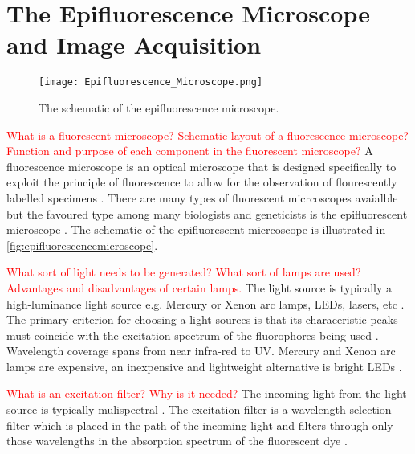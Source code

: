 
\section{The Epifluorescence Microscope and Image Acquisition}
\label{sec:TheEpifluorescenceMicroscope}

\begin{figure}[!t]
	\centering
	\texttt{[image: Epifluorescence\_Microscope.png]}
	\caption{The schematic of the epifluorescence microscope.}
	\label{fig:epifluorescencemicroscope}
\end{figure}

\textcolor{red}{What is a fluorescent microscope? Schematic layout of a fluorescence microscope? Function and purpose of each component in the fluorescent microscope?}
A fluorescence microscope is an optical microscope that is designed specifically to exploit the principle of fluorescence to allow for the observation of flourescently labelled specimens \citep{Hubeny2008,Sarder2006,Dobrucki2013,Andrews2002,Fatima2008}.
There are many types of fluorescent micrcoscopes avaialble but the favoured type among many biologists and geneticists is the epifluorescent microscope \citep{Rice2016,AbramowitzDavidson2016}.
The schematic of the epifluorescent micrcoscope is illustrated in \autoref{fig:epifluorescencemicroscope}.

\begin{definition}
	\textcolor{red}{What sort of light needs to be generated? What sort of lamps are used? Advantages and disadvantages of certain lamps.}
	The light source is typically a high-luminance light source e.g. Mercury or Xenon arc lamps, LEDs, lasers, etc  \citep{Danek2012,Hubeny2008,Aswani2012,Rice2016,ThermoFisher2016}.
	The primary criterion for choosing a light sources is that its characeristic peaks must coincide with the excitation spectrum of the fluorophores being used \citep{LichtmanConchello2005,Spring2003,Fatima2008}.
	Wavelength coverage spans from near infra-red to UV. Mercury and Xenon arc lamps are expensive, an inexpensive and lightweight alternative is bright LEDs \citep{Fatima2008,Dobrucki2013,Aswani2012,Koch1972}.
\end{definition}

\begin{definition}
	\textcolor{red}{What is an excitation filter? Why is it needed?}
	The incoming light from the light source is typically mulispectral \citep{SpringDavisdson2016}. 
	The excitation filter is a wavelength selection filter which is placed in the path of the incoming light and filters through only those wavelengths in the absorption spectrum of the fluorescent dye \citep{ThermoFisher2016,Danek2012,Hubeny2008,LichtmanConchello2005,Spring2003,CudeBurke2014,Fatima2008,Dobrucki2013}.
\end{definition}

